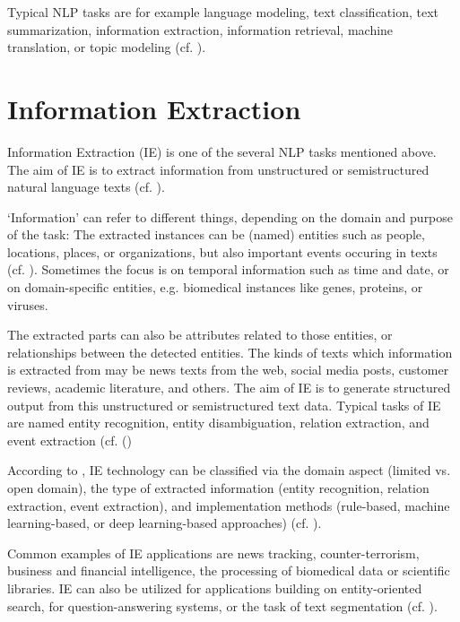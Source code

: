 Typical NLP tasks are for example language modeling, text classification, text summarization, information extraction, information retrieval, machine translation, or topic modeling (cf. \cite[6-7]{vajjala_practical_2020}).

\section{Information Extraction}

Information Extraction (IE) is one of the several NLP tasks mentioned above. The aim of IE is to extract information from unstructured or semistructured natural language texts (cf. \cite[227]{zong_information_2021}).

`Information' can refer to different things, depending on the domain and purpose of the task: The extracted instances can be (named) entities such as people, locations, places, or organizations, but also important events occuring in texts (cf. \cite[161]{vajjala_practical_2020}). Sometimes the focus is on temporal information such as time and date, or on domain-specific entities, e.g. biomedical instances like genes, proteins, or viruses.

The extracted parts can also be attributes related to those entities, or relationships between the detected entities. 
The kinds of texts which information is extracted from may be news texts from the web, social media posts, customer reviews, academic literature, and others. The aim of IE is to generate structured output from this unstructured or semistructured text data. 
Typical tasks of IE are named entity recognition, entity disambiguation, relation extraction, and event extraction (cf. (\cite[227]{zong_information_2021})

According to \cite{zong_information_2021}, IE technology can be classified via the domain aspect (limited vs. open domain), the type of extracted information (entity recognition, relation extraction, event extraction), and implementation methods (rule-based, machine learning-based, or deep learning-based approaches) (cf. \cite[229]{zong_information_2021}).

Common examples of IE applications are news tracking, counter-terrorism, business and financial intelligence, the processing of biomedical data or scientific libraries. IE can also be utilized for applications building on entity-oriented search, for question-answering systems, or the task of text segmentation (cf. \cite{aggarwal_machine_2018}).

